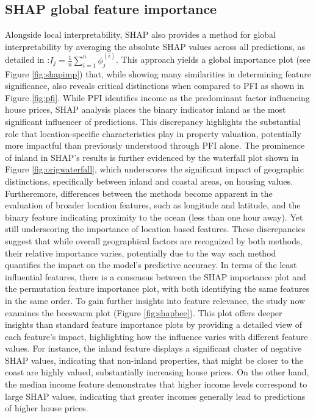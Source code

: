 \documentclass[12pt]{article}
\begin{document}
\subsection{SHAP global feature importance}
	Alongside local interpretability, SHAP also provides a method for global interpretability by averaging the absolute SHAP values across all predictions, as detailed in \citet[Section~7.9]{molnarSHAP}:$
	I_j = \frac{1}{n} \sum_{i=1}^{n} \phi^{(i)}_{j}$. This approach yields a global importance plot (see Figure \ref{fig:shapimp}) that, while showing many similarities in determining feature significance, also reveals critical distinctions when compared to PFI as shown in Figure \ref{fig:pfi}. While PFI identifies income as the predominant factor influencing house prices, SHAP analysis places the binary indicator inland as the most significant influencer of predictions. This discrepancy highlights the substantial role that location-specific characteristics play in property valuation, potentially more impactful than previously understood through PFI alone.
The prominence of inland in SHAP's results is further evidenced by the waterfall plot shown in Figure \ref{fig:origwaterfall}, which underscores the significant impact of geographic distinctions, specifically between inland and coastal areas, on housing values. 
Furtheremore, differences between the methods become apparent in the evaluation of broader location features, such as longitude and latitude, and the binary feature indicating proximity to the ocean (less than one hour away). Yet still underscoring the importance of location based features.
These discrepancies suggest that while overall geographical factors are recognized by both methods, their relative importance varies, potentially due to the way each method quantifies the impact on the model’s predictive accuracy.
In terms of the least influential features, there is a consensus between the SHAP importance plot and the permutation feature importance plot, with both identifying the same features in the same order.
To gain further insights into feature relevance, the study now examines the beeswarm plot (Figure \ref{fig:shapbee}).
This plot offers deeper insights than standard feature importance plots by providing a detailed view of each feature's impact, highlighting how the influence varies with different feature values. For instance, the inland feature displays a significant cluster of negative SHAP values, indicating that non-inland properties, that might be closer to the coast are highly valued, substantially increasing house prices.
On the other hand,  the median income feature demonstrates that higher income levels correspond to large SHAP values, indicating that greater incomes generally lead to predictions of higher house prices.
\end{document}
